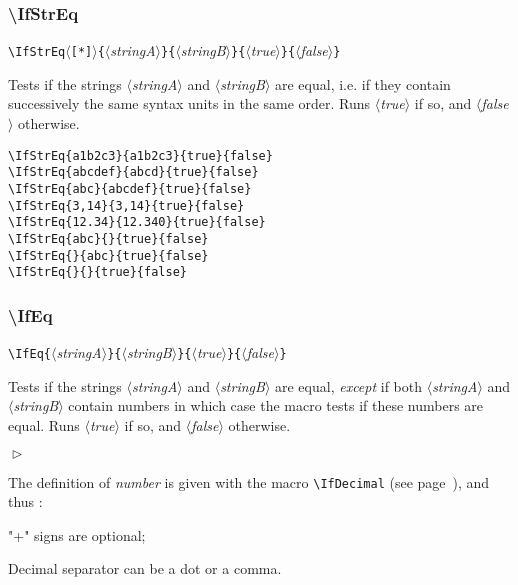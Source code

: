\documentclass[a4paper,10pt]{article}
\newcommand\guill[1]{"#1"}
\newcommand\argu[1]{$\langle$\textit{#1}$\rangle$}
\newcommand\ARGU[1]{\texttt{\{}\argu{#1}\texttt{\}}}
\newcommand\etoile{$\langle$\texttt{[*]}$\rangle$}
\newenvironment{Conditions}[1][1cm]%
{\begin{list}%
	{$\vartriangleright$}%
	{\setlength{\leftmargin}{#1}
	 \setlength{\itemsep}{0pt}
	 \setlength{\parsep}{0pt}
	 \setlength{\topsep}{2ptplus3ptminus2pt}
	}}%
{\end{list}}
\newcommand\USs{syntax units\xspace}
\newcommand\styleexemple{\small\vskip4pt}
\newcommand\verbinline{\lstinline[basicstyle=\normalsize\ttfamily]}
\begin{document}
\subsubsection{\ttfamily\textbackslash IfStrEq}

\verbinline|\IfStrEq|\etoile\ARGU{stringA}\ARGU{stringB}\ARGU{true}\ARGU{false}
\smallskip

Tests if the strings \argu{stringA} and \argu{stringB} are equal, i.e. if they contain successively the same \USs in the same order. Runs \argu{true} if so, and \argu{false} otherwise.\smallskip

\begin{minipage}[t]{0.65\linewidth}
\begin{lstlisting}
\IfStrEq{a1b2c3}{a1b2c3}{true}{false}
\IfStrEq{abcdef}{abcd}{true}{false}
\IfStrEq{abc}{abcdef}{true}{false}
\IfStrEq{3,14}{3,14}{true}{false}
\IfStrEq{12.34}{12.340}{true}{false}
\IfStrEq{abc}{}{true}{false}
\IfStrEq{}{abc}{true}{false}
\IfStrEq{}{}{true}{false}
\end{lstlisting}%
\end{minipage}\hfill
\begin{minipage}[t]{0.35\linewidth}
	\styleexemple
	\par
	\par
	\par
	\par
	\par
	\par
	\par
\end{minipage}%

\subsubsection{\ttfamily\textbackslash IfEq}

\verbinline|\IfEq|\ARGU{stringA}\ARGU{stringB}\ARGU{true}\ARGU{false}
\smallskip

Tests if the strings \argu{stringA} and \argu{stringB} are equal, \emph{except} if both \argu{stringA} and \argu{stringB} contain numbers in which case the macro tests if these numbers are equal. Runs \argu{true} if so, and \argu{false} otherwise.\smallskip

\begin{Conditions}
	\item The definition of \emph{number} is given with the macro \verbinline|\IfDecimal| (see page~\pageref{ifdecimal}), and thus :
	\item \guill{+} signs are optional;
	\item Decimal separator can be a dot or a comma.
\end{Conditions}
\end{document}
